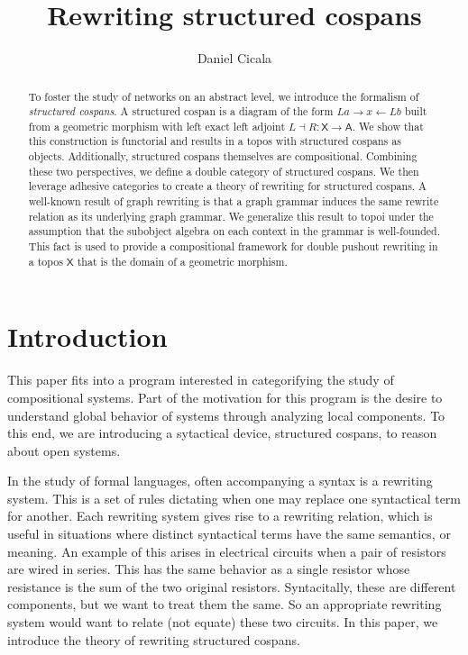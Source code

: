 \documentclass{amsart}
\author{Daniel Cicala}
\title{Rewriting structured cospans}
\newcommand{\A}{\cat{A}}
\newcommand{\X}{\cat{X}}
\newcommand{\cat}[1]{\mathsf{#1}}
\newcommand{\from}{\colon}
\renewcommand{\gets}{\leftarrow}
\theoremstyle{remark}
\theoremstyle{definition}
\begin{document}
\maketitle{}

\begin{abstract}
  To foster the study of networks on an abstract level, we introduce
  the formalism of \emph{structured cospans}. A structured cospan is a
  diagram of the form $ La \to x \gets Lb $ built from a geometric
  morphism with left exact left adjoint
  $ L \dashv R \from \X \to \A $.  We show that this construction is
  functorial and results in a topos with structured cospans as objects.
  Additionally, structured cospans themselves are
  compositional. Combining these two perspectives, we define a double
  category of structured cospans.  We then leverage adhesive
  categories to create a theory of rewriting for structured cospans. A
  well-known result of graph rewriting is that a graph grammar induces
  the same rewrite relation as its underlying graph grammar. We
  generalize this result to topoi under the assumption that the
  subobject algebra on each context in the grammar is well-founded.
  This fact is used to provide a compositional framework for double
  pushout rewriting in a topos $ \X $ that is the domain of a
  geometric morphism.  
\end{abstract}


\section{Introduction}
\label{sec:Introduction}

This paper fits into a program interested in categorifying the study
of compositional systems.  Part of the motivation for this program is
the desire to understand global behavior of systems through analyzing
local components.  To this end, we are introducing a sytactical
device, structured cospans, to reason about open systems.

In the study of formal languages, often accompanying a syntax is a
rewriting system.  This is a set of rules dictating when one may
replace one syntactical term for another.  Each rewriting system gives
rise to a rewriting relation, which is useful in situations where
distinct syntactical terms have the same semantics, or meaning.  An
example of this arises in electrical circuits when a pair of
resistors are wired in series. This has the same behavior as a single
resistor whose resistance is the sum of the two original resistors.
Syntacitally, these are different components, but we want to treat
them the same.  So an appropriate rewriting system would want to
relate (not equate) these two circuits.   In this paper, we introduce
the theory of rewriting structured cospans.
\end{document}
